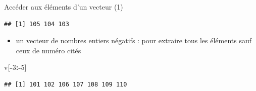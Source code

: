 \documentclass[
  ignorenonframetext,
]{beamer}
\newenvironment{Shaded}{\begin{snugshade}}{\end{snugshade}}
\newcommand{\DecValTok}[1]{\textcolor[rgb]{0.00,0.00,0.81}{#1}}
\newcommand{\NormalTok}[1]{#1}
\newcommand{\SpecialCharTok}[1]{\textcolor[rgb]{0.81,0.36,0.00}{\textbf{#1}}}
\providecommand{\tightlist}{%
  \setlength{\itemsep}{0pt}\setlength{\parskip}{0pt}}
\begin{document}
\begin{frame}[fragile]{Accéder aux éléments d'un vecteur (1)}
\begin{verbatim}
## [1] 105 104 103
\end{verbatim}

\normalsize

\begin{itemize}
\tightlist
\item
  un vecteur de nombres entiers négatifs : pour extraire tous les
  éléments sauf ceux de numéro cités
\end{itemize}

\tiny

\begin{Shaded}
\begin{Highlighting}[]
\NormalTok{v[}\SpecialCharTok{{-}}\DecValTok{3}\SpecialCharTok{:{-}}\DecValTok{5}\NormalTok{]}
\end{Highlighting}
\end{Shaded}

\begin{verbatim}
## [1] 101 102 106 107 108 109 110
\end{verbatim}

\normalsize
\end{frame}
\end{document}
